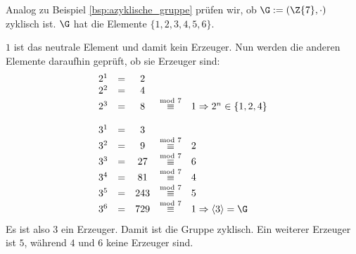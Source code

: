 \begin{beispiel}
  Analog zu Beispiel \ref{bsp:azyklische_gruppe} prüfen wir, ob $\G :=
  (\Z{7}, \cdot)$ zyklisch ist. $\G$ hat die Elemente $\{1, 2, 3, 4, 5,
  6\}$.

  $1$ ist das neutrale Element und damit kein Erzeuger. Nun werden die
  anderen Elemente daraufhin geprüft, ob sie Erzeuger sind:
\[  \begin{array}[]{ccccl}
    2^1 &= & 2 & &\\
    2^2 &= & 4 & &\\
    2^3 &= & 8 &\stackrel{\text{mod 7}}{\equiv}& 1 \Rightarrow 2^n \in \{1, 2, 4\}\\
\\    
    3^1 &= & 3 & &\\
    3^2 &= & 9  & \stackrel{\text{mod 7}}{\equiv}& 2\\
    3^3 &= & 27 & \stackrel{\text{mod 7}}{\equiv}& 6\\
    3^4 &= & 81 & \stackrel{\text{mod 7}}{\equiv}& 4\\
    3^5 &= & 243& \stackrel{\text{mod 7}}{\equiv}& 5\\
    3^6 &= & 729& \stackrel{\text{mod 7}}{\equiv}& 1 \Rightarrow \langle 3\rangle = \G
   \end{array}\]
  Es ist also $3$ ein Erzeuger. Damit ist die Gruppe zyklisch. Ein
  weiterer Erzeuger ist $5$, während $4$ und $6$ keine Erzeuger sind.

\end{beispiel}